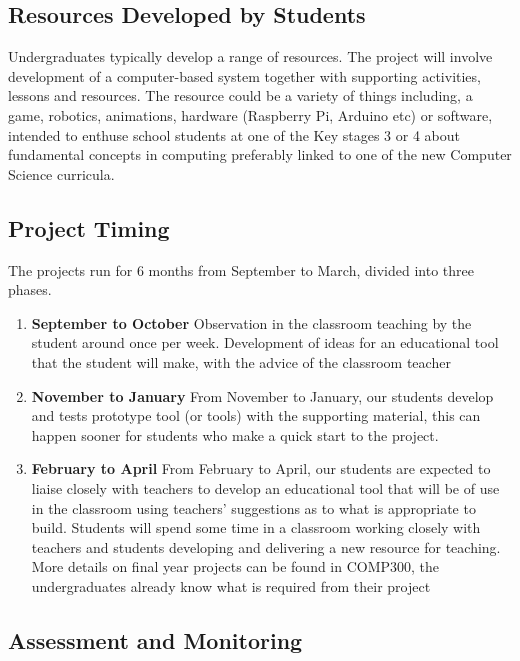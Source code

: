 \documentclass[
  12pt,
]{book}
\providecommand{\tightlist}{%
  \setlength{\itemsep}{0pt}\setlength{\parskip}{0pt}}
\begin{document}
\subsection{Resources Developed by Students}\label{resources}

Undergraduates typically develop a range of resources. The project will involve development of a computer-based system together with supporting activities, lessons and resources. The resource could be a variety of things including, a game, robotics, animations, hardware (Raspberry Pi, Arduino etc) or software, intended to enthuse school students at one of the Key stages 3 or 4 about fundamental concepts in computing preferably linked to one of the new Computer Science curricula.

\subsection{Project Timing}\label{timing}

The projects run for 6 months from September to March, divided into three phases.

\begin{enumerate}
\def\labelenumi{\arabic{enumi}.}
\tightlist
\item
  \textbf{September to October} Observation in the classroom teaching by the student around once per week. Development of ideas for an educational tool that the student will make, with the advice of the classroom teacher
\item
  \textbf{November to January} From November to January, our students develop and tests prototype tool (or tools) with the supporting material, this can happen sooner for students who make a quick start to the project.
\item
  \textbf{February to April} From February to April, our students are expected to liaise closely with teachers to develop an educational tool that will be of use in the classroom using teachers' suggestions as to what is appropriate to build. Students will spend some time in a classroom working closely with teachers and students developing and delivering a new resource for teaching. More details on final year projects can be found in COMP300, the undergraduates already know what is required from their project
\end{enumerate}

\subsection{Assessment and Monitoring}\label{assessment}
\end{document}
